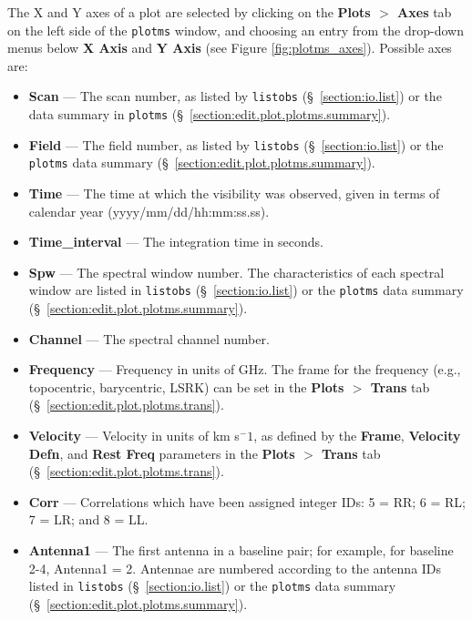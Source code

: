 The X and Y axes of a plot are selected by clicking on the {\bf Plots $>$ Axes} tab on the left side of the {\tt plotms} window, and choosing an entry from the drop-down menus below {\bf X Axis} and {\bf Y Axis} (see Figure \ref{fig:plotms_axes}). Possible axes are:
\begin{itemize}
\item {\bf Scan} --- The scan number, as listed by {\tt listobs} (\S~\ref{section:io.list}) or the data summary in {\tt plotms} (\S~\ref{section:edit.plot.plotms.summary}).

\item {\bf Field} --- The field number, as listed by {\tt listobs} (\S~\ref{section:io.list}) or the {\tt plotms} data summary (\S~\ref{section:edit.plot.plotms.summary}).

\item {\bf Time} --- The time at which the visibility was observed, given in terms of calendar year (yyyy/mm/dd/hh:mm:ss.ss).

\item {\bf Time\_interval} --- The integration time in seconds.

\item {\bf Spw} --- The spectral window number. The characteristics of each spectral window are listed in {\tt listobs} (\S~\ref{section:io.list}) or the {\tt plotms} data summary (\S~\ref{section:edit.plot.plotms.summary}).

\item {\bf Channel} --- The spectral channel number.

\item {\bf Frequency} --- Frequency in units of GHz. The frame for the frequency (e.g., topocentric, barycentric, LSRK) can be set in the {\bf Plots $>$ Trans} tab (\S~\ref{section:edit.plot.plotms.trans}).

\item {\bf Velocity} --- Velocity in units of km s$^-1$, as defined by the {\bf Frame}, {\bf Velocity Defn}, and {\bf Rest Freq} parameters in the {\bf Plots $>$ Trans} tab (\S~\ref{section:edit.plot.plotms.trans}).

\item {\bf Corr} --- Correlations which have been assigned integer IDs:  5 = RR; 6 = RL; 7 = LR; and 8 = LL.

\item {\bf Antenna1} --- The first antenna in a baseline pair; for example, for baseline 2-4, Antenna1 = 2. Antennae are numbered according to the antenna IDs listed in {\tt listobs} (\S~\ref{section:io.list}) or the {\tt plotms} data summary (\S~\ref{section:edit.plot.plotms.summary}).


\end{itemize}
